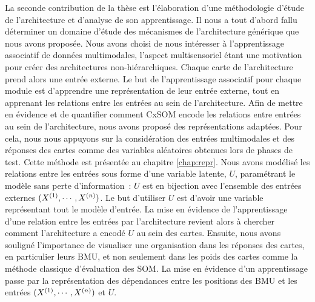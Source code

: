 La seconde contribution de la thèse est l'élaboration d'une méthodologie d'étude de l'architecture et d'analyse de son apprentissage. 
Il nous a tout d'abord fallu déterminer un domaine d'étude des mécanismes de l'architecture générique que nous avons proposée. 
Nous avons choisi de nous intéresser à l'apprentissage associatif de données multimodales, l'aspect multisensoriel étant une motivation pour créer des architectures non-hiérarchiques. Chaque carte de l'architecture prend alors une entrée externe.
Le but de l'apprentissage associatif pour chaque module est d'apprendre une représentation de leur entrée externe, tout en apprenant les relations entre les entrées au sein de l'architecture.
Afin de mettre en évidence et de quantifier comment CxSOM encode les relations entre entrées au sein de l'architecture, nous avons proposé des représentations adaptées. Pour cela, nous nous appuyons sur la considération des entrées multimodales et des réponses des cartes comme des variables aléatoires obtenues lors de phases de test. Cette méthode est présentée au chapitre \ref{chap:repr}.
Nous avons modélisé les relations entre les entrées sous forme d'une variable latente, $U$, paramétrant le modèle sans perte d'information~: $U$ est en bijection avec l'ensemble des entrées externes $(X^{({1})}, \cdots, X^{({n})})$. Le but d'utiliser $U$ est d'avoir une variable représentant tout le modèle d'entrée.
La mise en évidence de l'apprentissage d'une relation entre les entrées par l'architecture revient alors à chercher comment l'architecture a encodé $U$ au sein des cartes.
Ensuite, nous avons souligné l'importance de visualiser une organisation dans les réponses des cartes, en particulier leurs BMU, et non seulement dans les poids des cartes comme la méthode classique d'évaluation des SOM. La mise en évidence d'un apprentissage passe par la représentation des dépendances entre les positions des BMU et les entrées $(X^{({1})}, \cdots, X^{({n})})$ et $U$.


